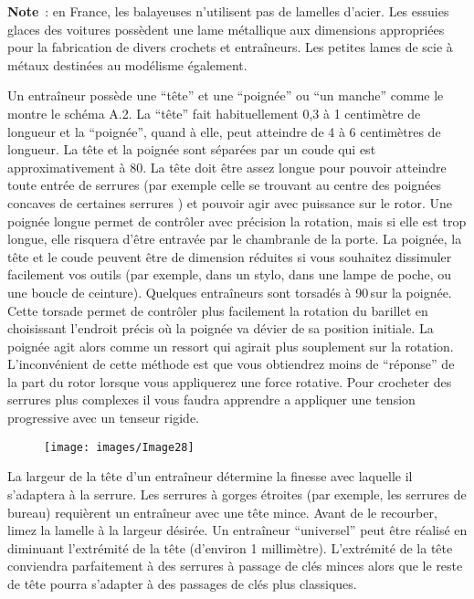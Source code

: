 \documentclass[a4paper,french,11pt,twoside]{report}
\begin{document}
\medskip
\noindent \textbf{Note}~: en France, les balayeuses n'utilisent pas de lamelles d'acier. Les essuies glaces des voitures possèdent une lame métallique aux dimensions appropriées pour la fabrication de divers crochets et entraîneurs. Les petites lames de scie à métaux destinées au modélisme également.

\medskip
Un entraîneur possède une \enquote{tête} et une \enquote{poignée} ou \enquote{un manche} comme le montre le schéma A.2. La \enquote{tête} fait habituellement 0,3 à 1 centimètre de longueur et la \enquote{poignée}, quand à elle, peut atteindre de 4 à 6 centimètres de longueur. La tête et la poignée sont séparées par un coude qui est approximativement à 80\degres. La tête doit être assez longue pour pouvoir atteindre toute entrée de serrures (par exemple celle se trouvant au centre des poignées concaves de certaines serrures ) et pouvoir agir avec puissance sur le rotor. Une poignée longue permet de contrôler avec précision la rotation, mais si elle est trop longue, elle risquera d'être entravée par le chambranle de la porte. La poignée, la tête et le coude peuvent être de dimension réduites si vous souhaitez dissimuler facilement vos outils (par exemple, dans un stylo, dans une lampe de poche, ou une boucle de ceinture). Quelques entraîneurs sont torsadés à 90\degres\,sur la poignée. Cette torsade permet de contrôler plus facilement la rotation du barillet en choisissant l'endroit précis où la poignée va dévier de sa position initiale. La poignée agit alors comme un ressort qui agirait plus souplement sur la rotation. L'inconvénient de cette méthode est que vous obtiendrez moins de \enquote{réponse} de la part du rotor lorsque vous appliquerez une force rotative. Pour crocheter des serrures plus complexes il vous faudra apprendre a appliquer une tension progressive avec un tenseur rigide.

\begin{figure}[ht]
  \begin{center}
    \texttt{[image: images/Image28]}
    \caption{}
  \end{center}
\end{figure}

La largeur de la tête d'un entraîneur détermine la finesse avec laquelle il s'adaptera à la serrure. Les serrures à gorges étroites (par exemple, les serrures de bureau) requièrent un entraîneur avec une tête mince. Avant de le recourber, limez la lamelle à la largeur désirée. Un entraîneur \enquote{universel} peut être réalisé en diminuant l'extrémité de la tête (d'environ 1 millimètre). L'extrémité de la tête conviendra parfaitement à des serrures à passage de clés minces alors que le reste de tête pourra s'adapter à des passages de clés plus classiques.
\end{document}
